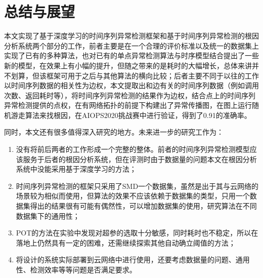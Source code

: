 
\chapter{总结与展望}
\label{cha:summary}
本文实现了基于深度学习的时间序列异常检测框架和基于时间序列异常检测的根因分析系统两个部分的工作，前者主要是在一个合理的评价标准以及统一的数据集上实现了已有的多种算法，也对已有的单点异常检测算法与时序模型结合提出了一些新的模型，在效果上有小幅的提升，但随之带来的是耗时的大幅增长，总体来讲并不划算，但该框架可用于之后与其他算法的横向比较；后者主要不同于以往的工作以时间序列数据的相关性为边权，本文提取出和边有关的时间序列数据（例如调用次数、返回耗时等），将时间序列异常检测的结果作为边权，结合点上的时间序列异常检测提供的点权，在有网络拓扑的前提下构建出了异常传播图，在图上运行随机游走算法来找根因，在AIOPS2020挑战赛中进行验证，得到了0.91的准确率。

同时，本文还有很多值得深入研究的地方。未来进一步的研究工作为：
\begin{enumerate}
    \item 没有将前后两者的工作形成一个完整的整体。前者的时间序列异常检测模型应该服务于后者的根因分析系统，但在评测时由于数据量的问题本文在根因分析系统中没能采用基于深度学习的方法；
    \item 时间序列异常检测的框架只采用了SMD一个数据集，虽然是出于其与云网络的场景较为相似而使用，但算法的效果不应该依赖于数据集的类型，只用一个数据集得出的结果很有可能有偶然性，可以增加数据集的使用，研究算法在不同数据集下的通用性；
    \item POT的方法在实验中发现对超参的选取十分敏感，同时耗时也不稳定，所以在落地上仍然具有一定的困难，还需继续探索其他自动确立阈值的方法；
    \item 将设计的系统实际部署到云网络中进行使用，还要考虑数据量的问题、通用性、检测效率等等问题是否满足要求。
\end{enumerate}

